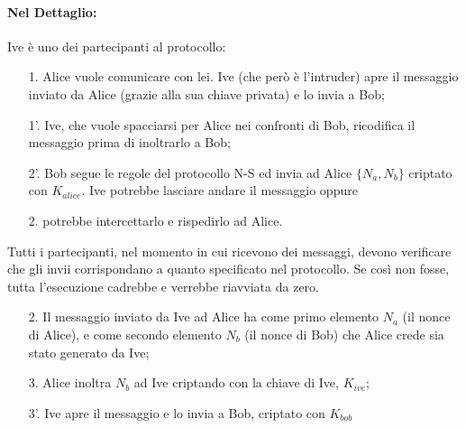 \paragraph{Nel Dettaglio: }
Ive è uno dei partecipanti al protocollo:

\begin{enumerate}
    \item[1.]  Alice vuole comunicare con lei. Ive (che però è l'intruder)
        apre il messaggio inviato da Alice
        (grazie alla sua chiave privata) e lo invia a Bob;
    \item[1'.] Ive, che vuole spacciarsi per Alice nei confronti di Bob,
        ricodifica il messaggio prima di inoltrarlo
        a Bob;
    \item[2'.] Bob segue le regole del protocollo N-S ed invia ad Alice
        \(\{N_a, N_b\}\) criptato con \(K_{alice}\). Ive
        potrebbe lasciare andare il messaggio oppure
    \item[2.] potrebbe intercettarlo e rispedirlo ad Alice.
\end{enumerate}
Tutti i partecipanti, nel momento in cui ricevono dei messaggi, devono
verificare che gli invii
corrispondano a quanto specificato nel protocollo. Se così non fosse, tutta
l'esecuzione cadrebbe e
verrebbe riavviata da zero.

\begin{enumerate}
    \item[2.] Il messaggio inviato da Ive ad Alice ha come primo
        elemento \(N_a\) (il nonce di Alice), e come secondo elemento \(N_b\)
        (il nonce di Bob) che Alice crede sia stato
        generato da Ive;
    \item[3.] Alice inoltra \(N_b\) ad Ive criptando con la chiave di Ive, \(K_{ive}\);
    \item[3'.] Ive apre il messaggio e lo invia a Bob, criptato con \(K_{bob}\)
\end{enumerate}

